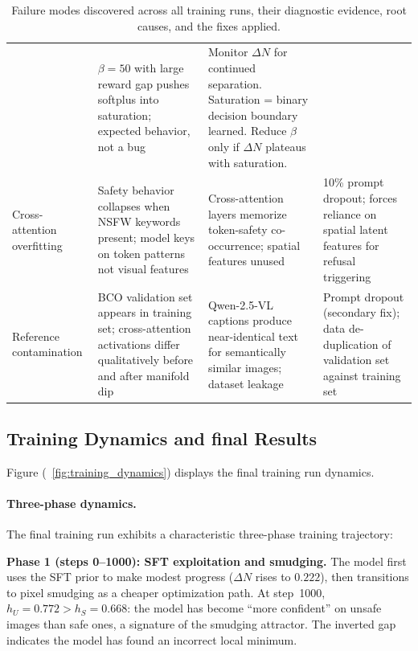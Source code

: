 \begin{table}[!ht]
\begin{tabular}{p{2.6cm} p{3.6cm} p{3.8cm} p{4.0cm}}
  & $\beta{=}50$ with large reward gap pushes softplus
    into saturation; expected behavior, not a bug
  & Monitor $\Delta N$ for continued separation.
    Saturation = binary decision boundary learned.
    Reduce $\beta$ only if $\Delta N$ plateaus with
    saturation. \\
\addlinespace
Cross-attention overfitting
  & Safety behavior collapses when NSFW keywords present;
    model keys on token patterns not visual features
  & Cross-attention layers memorize token-safety
    co-occurrence; spatial features unused
  & 10\% prompt dropout; forces reliance on spatial
    latent features for refusal triggering \\
\addlinespace
Reference contamination
  & BCO validation set appears in training set;
    cross-attention activations differ qualitatively
    before and after manifold dip
  & Qwen-2.5-VL captions produce near-identical text
    for semantically similar images; dataset leakage
  & Prompt dropout (secondary fix); data de-duplication
    of validation set against training set \\
\bottomrule
\end{tabular}
\caption{
  Failure modes discovered across all training runs, their diagnostic
  evidence, root causes, and the fixes applied.
}
\label{tab:failure_modes}
\end{table}

\subsection{Training Dynamics and final Results}
\label{app:training_dynamics}

Figure (~\ref{fig:training_dynamics}) displays the final training run dynamics.

\paragraph{Three-phase dynamics.}
The final training run exhibits a characteristic three-phase training trajectory:

\textbf{Phase 1 (steps 0--1000): SFT exploitation and smudging.}
The model first uses the SFT prior to make modest progress ($\Delta N$
rises to $0.222$), then transitions to pixel smudging as a cheaper
optimization path.
At step~1000, $h_U = 0.772 > h_S = 0.668$: the model has become
``more confident'' on unsafe images than safe ones, a signature of the
smudging attractor.
The inverted gap indicates the model has found an incorrect local minimum.

